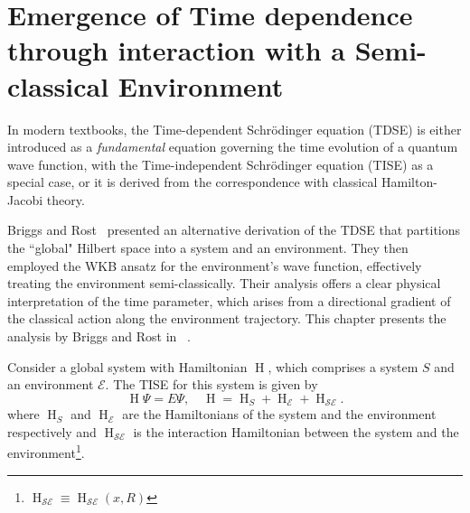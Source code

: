 \chapter[TDSE from Semi-classical Environment]{Emergence of Time dependence 
through interaction with a Semi-classical Environment\label{chap:briggs_rost_semiclassic}}

In modern textbooks, the Time-dependent Schr\"odinger equation (TDSE) is either introduced as a \emph{fundamental}
equation governing the time evolution of a quantum wave function, with the Time-independent Schr\"odinger
equation (TISE) as a special case, or it is derived from the correspondence with classical Hamilton-Jacobi 
theory.

Briggs and Rost~\cite{briggs2001derivation} presented an alternative derivation of the TDSE that partitions
the ``global" Hilbert space into a system and an environment. They then employed the WKB ansatz 
for the environment's wave function, effectively treating the environment semi-classically. Their analysis offers a clear physical interpretation of the time parameter, which arises from a directional gradient of the classical action along the environment trajectory.
This chapter presents the analysis by Briggs and Rost in ~\cite{briggs2001derivation}.

Consider a global system with Hamiltonian $\operatorname{H}$, which comprises a system $S$ and an environment $\mathcal{E}$. 
The TISE for this system is given by
\begin{equation}
\label{eqn:chap2_TISE}
\operatorname{H}\Psi = E\Psi, \quad \operatorname{H} = \operatorname{H}_S + \operatorname{H}_{\mathcal{E}} + \operatorname{H}_{\mathcal{SE}}.
\end{equation}
where $\operatorname{H}_S$ and $\operatorname{H}_{\mathcal{E}}$ are the Hamiltonians of the system 
and the environment respectively and $\operatorname{H}_{\mathcal{SE}}$ is the interaction
Hamiltonian between the system and the environment\footnote{$\operatorname{H}_{\mathcal{SE}}\equiv \operatorname{H}_{\mathcal{SE}}(x, R)$}.

